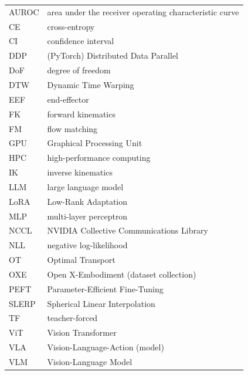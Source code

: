 \documentclass[english,12pt,a4paper,pdftex,elec,utf8]{aaltothesis}
\begin{document}
\begin{tabular}{ll}
AUROC      & area under the receiver operating characteristic curve \\
CE         & cross-entropy \\
CI         & confidence interval \\
DDP        & (PyTorch) Distributed Data Parallel \\
DoF        & degree of freedom \\
DTW        & Dynamic Time Warping \\
EEF        & end-effector \\
FK         & forward kinematics \\
FM         & flow matching \\
GPU        & Graphical Processing Unit \\
HPC        & high-performance computing \\
IK         & inverse kinematics \\
LLM        & large language model \\
LoRA       & Low-Rank Adaptation \\
MLP        & multi-layer perceptron \\
NCCL       & NVIDIA Collective Communications Library \\
NLL        & negative log-likelihood \\
OT         & Optimal Transport \\
OXE        & Open X-Embodiment (dataset collection) \\
PEFT       & Parameter-Efficient Fine-Tuning \\
SLERP      & Spherical Linear Interpolation \\
TF         & teacher-forced \\
ViT        & Vision Transformer \\
VLA        & Vision-Language-Action (model) \\
VLM        & Vision-Language Model \\


\end{tabular}


\cleardoublepage
\storeinipagenumber
{}
\setcounter{page}{1}
\end{document}
